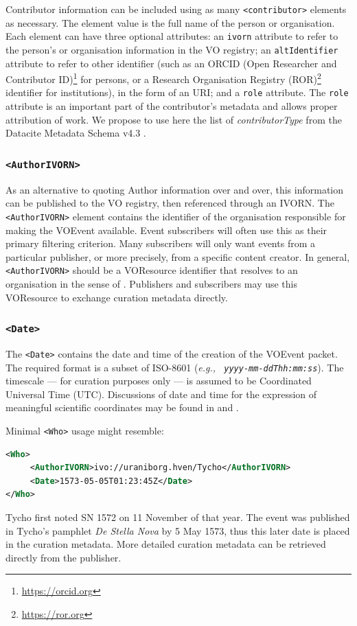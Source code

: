\documentclass[11pt,a4paper]{ivoa}
\begin{document}
Contributor information can be included using as many {\tt <contributor>} 
elements as necessary. The element value is the full name of the person or 
organisation. Each element can have three optional attributes: an {\tt ivorn} 
attribute to refer to the person's or organisation information in the VO 
registry; an {\tt altIdentifier} attribute to refer to other identifier (such 
as an ORCID (Open Researcher and Contributor ID)\footnote{
\url{https://orcid.org}} for persons, or a Research Organisation Registry 
(ROR)\footnote{\url{https://ror.org}} identifier for institutions), in the form 
of an URI; and a {\tt role} attribute. The {\tt role} attribute is an important 
part of the contributor's metadata and allows proper attribution of work. We 
propose to use here the list of \emph{contributorType} from the Datacite 
Metadata Schema v4.3 \citep{https://doi.org/10.14454/7xq3-zf69}.

\subsubsection{\tt <AuthorIVORN>}
As an alternative to quoting Author information over and over, this information 
can be published to the VO registry, then referenced through an IVORN. The {\tt 
<AuthorIVORN>} element contains the identifier of the organisation responsible 
for making the VOEvent available. Event subscribers will often use this as their 
primary filtering criterion. Many subscribers will only want events from a 
particular publisher, or more precisely, from a specific content creator. In 
general, {\tt <AuthorIVORN>} should be a VOResource identifier that resolves to 
an organisation in the sense of \citep{2007ivoa.spec.0302H}. Publishers and 
subscribers may use this VOResource to exchange curation metadata directly. 

\subsubsection{\tt <Date>}
The {\tt <Date>} contains the date and time of the creation of the VOEvent 
packet. The required format is a subset of ISO-8601 (\emph{e.g., {\tt 
yyyy-mm-ddThh:mm:ss}}). The timescale --- for curation purposes only --- is 
assumed to be Coordinated Universal Time (UTC). Discussions of date and time for 
the expression of meaningful scientific coordinates may be found in 
\citep{2007ivoa.spec.1030R} and \citep{bib26}. 


Minimal {\tt <Who>} usage might resemble: 
\begin{lstlisting}[language=XML]
<Who>
     <AuthorIVORN>ivo://uraniborg.hven/Tycho</AuthorIVORN>
     <Date>1573-05-05T01:23:45Z</Date>
</Who> 
\end{lstlisting}
Tycho first noted SN 1572 on 11 November of that year. The event was published 
in Tycho's pamphlet \emph{De Stella Nova} by 5 May 1573, thus this later date is 
placed in the curation metadata. More detailed curation metadata can be 
retrieved directly from the publisher. 
\end{document}

